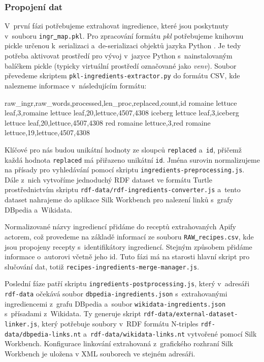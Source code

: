 \subsubsection{Propojení dat}

V~první fázi potřebujeme extrahovat ingredience, které jsou poskytnuty v~souboru \texttt{ingr\underline{{ }}map.pkl}. Pro zpracování formátu \emph{pkl} potřebujeme knihovnu pickle určenou k~serializaci a~de-serializaci objektů jazyka Python \citep{pickle}. Je tedy potřeba aktivovat prostředí pro vývoj v~jazyce Python s~nainstalovaným balíčkem pickle (typicky virtuální prostředí označované jako \emph{venv}). Soubor převedeme skriptem \texttt{pkl-ingredients-extractor.py} do formátu CSV, kde nalezneme informace v~následujícím formátu:

\begin{code}
raw_ingr,raw_words,processed,len_proc,replaced,count,id
romaine lettuce leaf,3,romaine lettuce leaf,20,lettuce,4507,4308
iceberg lettuce leaf,3,iceberg lettuce leaf,20,lettuce,4507,4308
red romaine lettuce,3,red romaine lettuce,19,lettuce,4507,4308
\end{code}

Klíčové pro nás budou unikátní hodnoty ze sloupců \texttt{replaced} a~\texttt{id}, přičemž každá hodnota \texttt{replaced} má přiřazeno unikátní \texttt{id}. Jména surovin normalizujeme na přísady pro vyhledávání pomocí skriptu \texttt{ingredients-preprocessing.js}. Dále z~nich vytvoříme jednoduchý RDF dataset ve formátu Turtle prostřednictvím skriptu \texttt{rdf-data/rdf-ingredients-converter.js} a~tento dataset nahrajeme do aplikace Silk Workbench pro nalezení linků s~grafy DBpedia a~Wikidata.

Normalizované názvy ingrediencí přidáme do receptů extrahovaných Apify actorem, což provedeme na základě informací ze souboru \texttt{RAW\underline{{ }}recipes.csv}, kde jsou propojeny recepty s~identifikátory ingrediencí. Stejným způsobem přidáme informace o~autorovi včetně jeho id. Tuto fázi má na starosti hlavní skript pro slučování dat, totiž \texttt{recipes-ingredients-merge-manager.js}.

Poslední fáze patří skriptu \texttt{ingredients-postprocessing.js}, který v~adresáři \texttt{rdf-data} očekává soubor \texttt{dbpedia-ingredients.json} s~extrahovanými ingrediencemi z~grafu DBpedia a~soubor \texttt{wikidata-ingredients.json} s~přísadami z~Wikidata. Ty generuje skript \texttt{rdf-data/external-dataset-linker.js}, který potřebuje soubory v~RDF formátu N-triples \texttt{rdf-data/dbpedia-links.nt} a~\texttt{rdf-data/wikidata-links.nt} vytvořené pomocí Silk Workbench. Konfigurace linkování extrahovaná z~grafického rozhraní Silk Workbench je uložena v XML souborech ve stejném adresáři.

